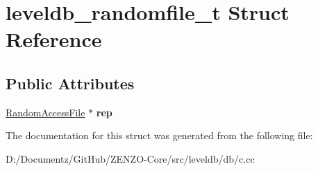 \hypertarget{structleveldb__randomfile__t}{}\section{leveldb\+\_\+randomfile\+\_\+t Struct Reference}
\label{structleveldb__randomfile__t}
\subsection*{Public Attributes}
\begin{DoxyCompactItemize}
\item 
\mbox{\label{structleveldb__randomfile__t_a66667ecc756a0ca312bbc94e2dfc27a5}} 
\mbox{\hyperlink{classleveldb_1_1_random_access_file}{Random\+Access\+File}} $\ast$ {\bfseries rep}
\end{DoxyCompactItemize}


The documentation for this struct was generated from the following file\+:\begin{DoxyCompactItemize}
\item 
D\+:/\+Documentz/\+Git\+Hub/\+Z\+E\+N\+Z\+O-\/\+Core/src/leveldb/db/c.\+cc\end{DoxyCompactItemize}
